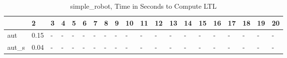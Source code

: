\begin{table}
\caption{simple_robot, Time in Seconds to Compute LTL}
\label{simple_robot_LTL_time}
\begin{tabular}{llllllllllllllllllll}
\toprule
 & 2 & 3 & 4 & 5 & 6 & 7 & 8 & 9 & 10 & 11 & 12 & 13 & 14 & 15 & 16 & 17 & 18 & 19 & 20 \\
\midrule
aut & 0.15 & - & - & - & - & - & - & - & - & - & - & - & - & - & - & - & - & - & - \\
aut_s & 0.04 & - & - & - & - & - & - & - & - & - & - & - & - & - & - & - & - & - & - \\
\bottomrule
\end{tabular}
\end{table}
